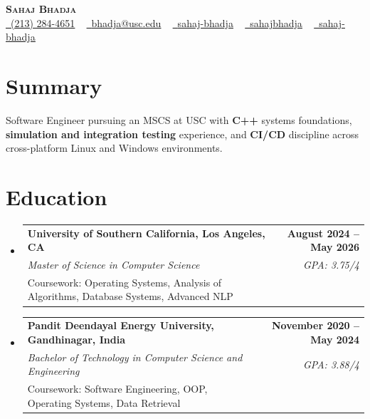 \documentclass[letterpaper,10pt]{article}
\makeatletter
\newcommand{\resumeEduSubheading}[5]{\vspace{-1pt}\item\begin{tabular*}{1.0\textwidth}[t]{l@{\extracolsep{\fill}}r}\textbf{#1} & \textbf{\small #2} \\\textit{\small #3} & \textit{\small #4} \\\small #5 & \\\end{tabular*}\vspace{-4pt}}
\newcommand{\resumeSubHeadingListStart}{\begin{itemize}[leftmargin=0.0in, label={}]}
\newcommand{\resumeSubHeadingListEnd}{\end{itemize}}
\makeatother
\begin{document}
\begin{center}
{\Huge \scshape \textbf{Sahaj Bhadja}} \\ \vspace{1pt}
\small \href{tel:(213) 284-4651}{\faPhone\ \underline{(213) 284-4651}} ~ \href{mailto: bhadja@usc.edu}{\raisebox{-0.2\height}\faEnvelope\ \underline{bhadja@usc.edu}} ~
\href{https://www.linkedin.com/in/sahaj-bhadja/}{\raisebox{-0.2\height}\faLinkedin\ \underline{sahaj-bhadja}} ~ \href{https://github.com/SAHAJ-BHADJA}{\raisebox{-0.2\height}\faGithub\ \underline{sahajbhadja}} ~
\href{https://sahaj-bhadja.vercel.app/}{\raisebox{-0.2\height}\faGlobe\ \underline{sahaj-bhadja}}
\end{center}
\vspace{-16pt}
\section{Summary}
\begin{itemize}[leftmargin=0.15in, label={}]
\small{\item{Software Engineer pursuing an MSCS at USC with \textbf{C++} systems foundations, \textbf{simulation and integration testing} experience, and \textbf{CI/CD} discipline across cross-platform Linux and Windows environments.}}
\end{itemize}
\vspace{-6pt}
\section{Education}
\resumeSubHeadingListStart
\resumeEduSubheading{University of Southern California, Los Angeles, CA}{August 2024 -- May 2026}{Master of Science in Computer Science}{GPA: 3.75/4}{Coursework: Operating Systems, Analysis of Algorithms, Database Systems, Advanced NLP}
\vspace{-9pt}
\resumeEduSubheading{Pandit Deendayal Energy University, Gandhinagar, India}{November 2020 -- May 2024}{Bachelor of Technology in Computer Science and Engineering}{GPA: 3.88/4}{Coursework: Software Engineering, OOP, Operating Systems, Data Retrieval}
\resumeSubHeadingListEnd
\vspace{-6pt}
\end{document}
